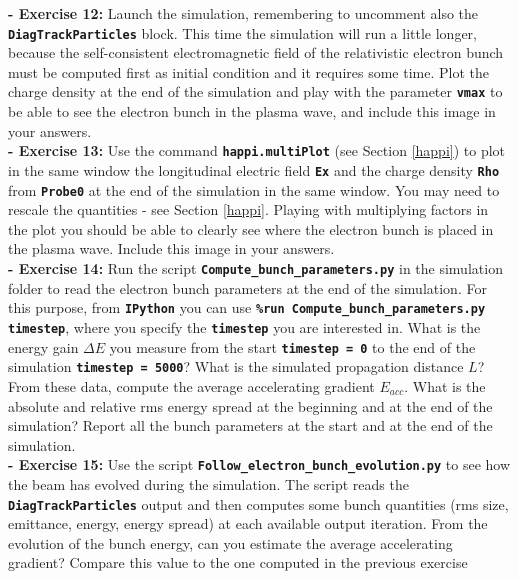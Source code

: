 \documentclass{article}
\newcommand{\commandline}[1]{\texttt{\textbf{#1}}}
\begin{document}
\textbf{ - Exercise 12:} Launch the simulation, remembering to uncomment also the \commandline{DiagTrackParticles} block. This time the simulation will run a little longer, because the self-consistent electromagnetic field of the relativistic electron bunch must be computed first as initial condition and it requires some time. Plot the charge density at the end  of the simulation and play with the parameter \commandline{vmax} to be able to see the electron bunch in the plasma wave, and include this image in your answers.\\

\textbf{ - Exercise 13:} Use the command \commandline{happi.multiPlot} (see Section \ref{happi}) to plot in the same window the longitudinal electric field \commandline{Ex} and the charge density \commandline{Rho} from \commandline{Probe0} at the end of the simulation in the same window. You may need to rescale the quantities - see Section \ref{happi}. Playing with multiplying factors in the plot you should be able to clearly see where the electron bunch is placed in the plasma wave. Include this image in your answers.\\

\textbf{ - Exercise 14:} Run the script \commandline{Compute\_bunch\_parameters.py} in the simulation folder to read the electron bunch parameters at the end of the simulation. For this purpose, from \commandline{IPython} you can use \commandline{\%run Compute\_bunch\_parameters.py timestep}, where you specify the \commandline{timestep} you are interested in. What is the energy gain $\Delta E$ you measure from the start \commandline{timestep = 0} to the end of the simulation \commandline{timestep = 5000}? What is the simulated propagation distance $L$? From these data, compute the average accelerating  gradient $E_{acc}$. What is the absolute and relative rms energy spread at the beginning and at the end of the simulation? Report all the bunch parameters at the start and at the end of the simulation.\\

\textbf{ - Exercise 15:} Use the script \commandline{Follow\_electron\_bunch\_evolution.py} to see how the beam has evolved during the simulation. The script reads the \commandline{DiagTrackParticles} output and then computes some bunch quantities (rms size, emittance, energy, energy spread) at each available output iteration. From the evolution of the bunch energy, can you estimate the average accelerating gradient? Compare this value to the one computed in the previous exercise\\
\end{document}

